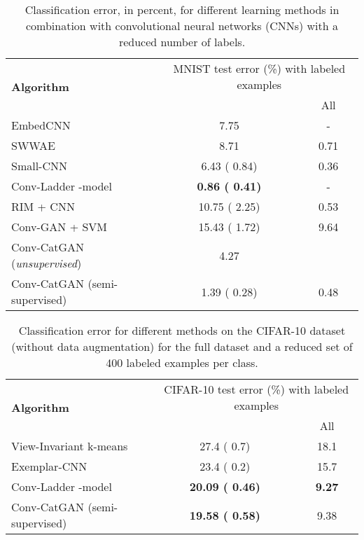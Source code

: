 \documentclass{article} \usepackage{iclr2016_conference,times}
\begin{document}
\begin{table}
  \begin{tabular}{lcc}
    \multirow{2}{*}{\bf Algorithm} & \multicolumn{2}{c}{MNIST test error (\%) with  labeled examples} \\
                                   &  & All \\
    \hline
    EmbedCNN \citep{Weston_2012} & 7.75 & - \\
    SWWAE \citep{Zhao_2015} & 8.71  & 0.71 \\
    Small-CNN \citep{Rasmus_NIPS2015} & 6.43 ( 0.84) & 0.36 \\
    Conv-Ladder -model \citep{Rasmus_NIPS2015} & \textbf{0.86 ( 0.41)} & - \\
    \hline
    RIM + CNN & 10.75 ( 2.25) & 0.53  \\
    Conv-GAN + SVM & 15.43 ( 1.72) & 9.64 \\
    Conv-CatGAN (\emph{unsupervised}) & 4.27  &  \\
    Conv-CatGAN (semi-supervised) & 1.39 ( 0.28) & 0.48 \\
  \end{tabular}
  \caption{Classification error, in percent, for different learning methods in combination with convolutional neural networks (CNNs) with a reduced number of labels.}
  \label{tab:cnn_mnist}
\end{table}


\begin{table}
  \begin{tabular}{lcc}
    \multirow{2}{*}{\bf Algorithm} & \multicolumn{2}{c}{CIFAR-10 test error (\%) with  labeled examples} \\
                                   &  & All \\
   \hline
    View-Invariant k-means \cite{Yuhui_2013} & 27.4 ( 0.7) & 18.1 \\
    Exemplar-CNN \citep{Dosovits_NIPS2014} & 23.4 ( 0.2) & 15.7 \\
    Conv-Ladder -model \citep{Rasmus_NIPS2015} & \textbf{20.09 ( 0.46)} & \textbf{9.27} \\
    \hline
    Conv-CatGAN (semi-supervised) & \textbf{19.58 ( 0.58)} & 9.38 \\
  \end{tabular}
  \caption{Classification error for different methods on the CIFAR-10 dataset (without data augmentation) for the full dataset and a reduced set of 400 labeled examples per class.}
  \label{tab:cifar10}
\end{table}
\end{document}
